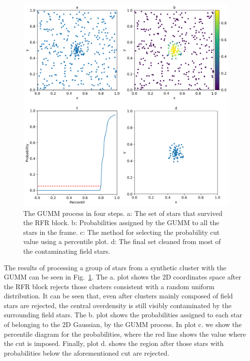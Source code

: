 \documentclass{aa}
\begin{document}
 \begin{figure}
 \includegraphics[width=\hsize]{figs/GUMM.png}
 \caption{The GUMM process in four steps. a: The set of stars that survived
 the RFR block. b: Probabilities assigned by the GUMM to all the stars in the
 frame. c: The method for selecting the probability cut value using a
 percentile plot. d: The final set cleaned from most of the contaminating
 field stars.}
 \label{fig:gumm}
 \end{figure}

 The results of processing a group of stars from a synthetic cluster with the
 GUMM can be seen in Fig.~\ref{fig:gumm}.
 The a. plot shows the 2D coordinates space after the RFR
 block rejects those clusters consistent with a random uniform distribution.
 It can be seen that, even after clusters mainly composed of field stars are
 rejected, the central overdensity is still visibly contaminated by the
 surrounding field stars. The b. plot shows the probabilities assigned to each
 star of belonging to the 2D Gaussian, by the GUMM process. In plot c. we show
 the percentile diagram for the probabilities, where the red line shows the
 value where the cut is imposed. Finally, plot d. shows the region after those
 stars with probabilities below the aforementioned cut are rejected.\\
\end{document}
